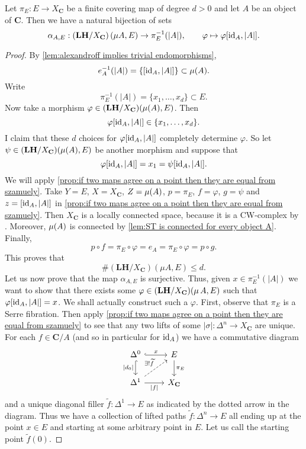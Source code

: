 \begin{proposition}
\label{coro:number of LHs is d if the degree is d}
Let $\pi_E : E \to X_\mathbf{C}$ be a finite covering map of degree $d>0$ and let $A$ be an object of $\mathbf{C}$. Then we have a natural bijection of sets
\[ \alpha_{A,E} : \left(\mathbf{LH}/X_\mathbf{C} \right)\left(\mu A, E \right) \to \pi_E^{-1}(|A|), \qquad \varphi \mapsto \varphi[\operatorname{id}_A, |A|]. \]
\end{proposition}
\begin{proof}
By \cref{lem:alexandroff implies trivial endomorphisms},
\[ e_A^{-1}(|A|) = \left\{ \left[ \operatorname{id}_A, |A| \right] \right\} \subset \operatorname{\mu}(A). \]
Write
\[ \pi_E^{-1}(|A|) = \{x_1,\ldots,x_d\} \subset E. \]
Now take a morphism $\varphi \in (\mathbf{LH}/X_{\mathbf{C}})(\operatorname{\mu}(A), E)$. Then
\[ \varphi[\operatorname{id}_A, |A|] \in \{x_1,\ldots,x_d\}. \]
I claim that these $d$ choices for $\varphi[\operatorname{id}_A,|A|]$ completely determine $\varphi$. 
So let $\psi \in (\mathbf{LH}/X_{\mathbf{C}})(\operatorname{\mu}(A),E)$ be another morphism and suppose that
\[ \varphi[\operatorname{id}_A,|A|] = x_1 = \psi[\operatorname{id}_A,|A|]. \]
We will apply \cref{prop:if two maps agree on a point then they are equal from szamuely}. 
Take $Y = E$, $X = X_{\mathbf{C}}$, $Z = \operatorname{\mu}(A)$, $p = \pi_E$, $f = \varphi$, $g = \psi$ and $z = [\operatorname{id}_A,|A|]$ in \cref{prop:if two maps agree on a point then they are equal from szamuely}. 
Then $X_{\mathbf{C}}$ is a locally connected space, because it is a CW-complex by \cite[Proposition I.2.3]{goersjardinne09}. Moreover, $\operatorname{\mu}(A)$ is connected by \cref{lem:ST is connected for every object A}. Finally,
\[ p \circ f = \pi_E \circ \varphi = e_A = \pi_E \circ \varphi = p \circ g. \]
This proves that
\[ \# \left(\mathbf{LH}/X_\mathbf{C} \right)\left(\mu A, E \right) \leq d. \]
Let us now prove that the map $\alpha_{A,E}$ is surjective. 
Thus, given $x \in \pi_E^{-1}(|A|)$ we want to show that there exists some $\varphi \in (\mathbf{LH}/X_{\mathbf{C}})(\operatorname{\mu} A, E)$ such that $\varphi[\operatorname{id}_A,|A|] = x$. We shall actually construct such a $\varphi$. First, observe that $\pi_E$ is a Serre fibration. Then apply \cref{prop:if two maps agree on a point then they are equal from szamuely} to see that any two lifts of some $|\sigma| : \Delta^n \to X_{\mathbf{C}}$ are unique. For each $f \in \mathbf{C}/A$ (and so in particular for $\operatorname{id}_A$) we have a commutative diagram
\[ \begin{tikzcd}
\Delta^0 \arrow[hook]{r}{x} \arrow[hook, swap]{d}{|d_0|} & E \arrow{d}{\pi_E} \\
\Delta^1 \arrow[swap]{r}{|f|} \arrow[dashed]{ur}{\exists ! \widetilde{f}} & X_{\mathbf{C}} \end{tikzcd} \]
and a unique diagonal filler $\widetilde{f} : \Delta^1 \to E$ as indicated by the dotted arrow in the diagram. Thus we have a collection of lifted paths $\widetilde{f} : \Delta^n \to E$ all ending up at the point $x \in E$ and starting at some arbitrary point in $E$. Let us call the starting point $\widetilde{f}(0)$. 


\end{proof}
